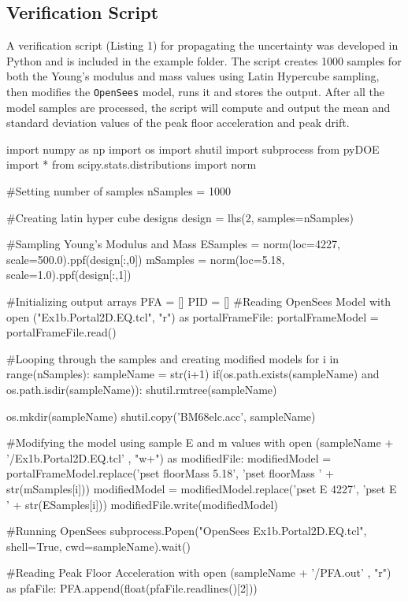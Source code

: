 \subsection{Verification Script}
A verification script (Listing 1) for propagating the uncertainty was
developed in Python and is included in the example folder.  The script
creates 1000 samples for both the Young’s modulus and mass values
using Latin Hypercube sampling, then modifies the \texttt{OpenSees}
model, runs it and stores the output.  After all the model samples are
processed, the script will compute and output the mean and standard
deviation values of the peak floor acceleration and peak drift.


\begin{python}[caption=Python script for analyzing the portal frame model with uncertain parameters]
import numpy as np
import os
import shutil
import subprocess
from pyDOE import *
from scipy.stats.distributions import norm

#Setting number of samples
nSamples = 1000

#Creating latin hyper cube designs
design = lhs(2, samples=nSamples)

#Sampling Young's Modulus and Mass
ESamples = norm(loc=4227, scale=500.0).ppf(design[:,0])
mSamples = norm(loc=5.18, scale=1.0).ppf(design[:,1])

#Initializing output arrays
PFA = []
PID = []
#Reading OpenSees Model
with open ("Ex1b.Portal2D.EQ.tcl", "r") as portalFrameFile:
    portalFrameModel = portalFrameFile.read()

    #Looping through the samples and creating modified models
    for i in range(nSamples):
        sampleName = str(i+1)
        if(os.path.exists(sampleName) and os.path.isdir(sampleName)):
            shutil.rmtree(sampleName)

        os.mkdir(sampleName)
        shutil.copy('BM68elc.acc', sampleName)

        #Modifying the model using sample E and m values
        with open (sampleName + '/Ex1b.Portal2D.EQ.tcl' , "w+") as modifiedFile:
            modifiedModel = portalFrameModel.replace('pset floorMass 5.18', 'pset floorMass ' + str(mSamples[i]))
            modifiedModel = modifiedModel.replace('pset E 4227', 'pset E ' + str(ESamples[i]))
            modifiedFile.write(modifiedModel)

        #Running OpenSees
        subprocess.Popen("OpenSees Ex1b.Portal2D.EQ.tcl", shell=True, cwd=sampleName).wait()

        #Reading Peak Floor Acceleration
        with open (sampleName + '/PFA.out' , "r") as pfaFile:
            PFA.append(float(pfaFile.readlines()[2]))


\end{python}
